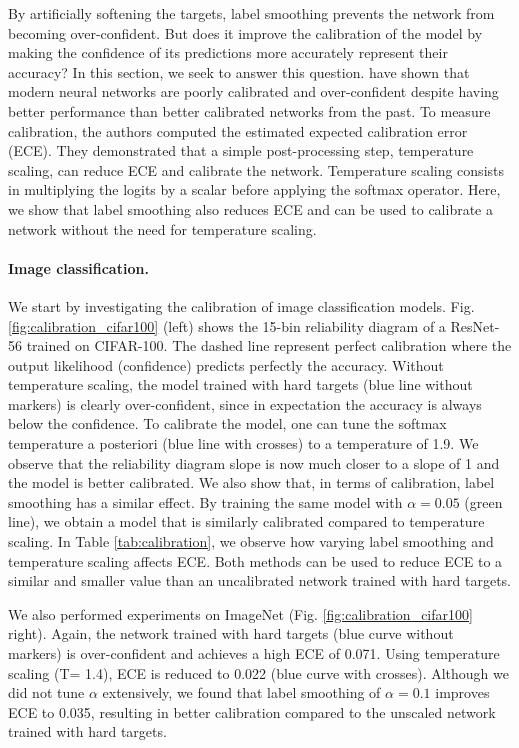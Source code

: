 \documentclass{article}
\begin{document}
By artificially softening the targets, label smoothing prevents the network from becoming over-confident. But does it improve the calibration of the model by making the confidence of its predictions more accurately represent their accuracy? In this section, we seek to answer this question. \citet{guo2017calibration} have shown that modern neural networks are poorly calibrated and over-confident despite having better performance than better calibrated networks from the past. To measure calibration, the authors computed the estimated expected calibration error (ECE). They demonstrated that a simple post-processing step, temperature scaling, can reduce ECE and calibrate the network. Temperature scaling consists in multiplying the logits by a scalar before applying the softmax operator. Here, we show that label smoothing also reduces ECE and can be used to calibrate a network without the need for temperature scaling. 

\paragraph{Image classification.} We start by investigating the calibration of image classification models. Fig. \ref{fig:calibration_cifar100} (left) shows the 15-bin reliability diagram of a ResNet-56 trained on CIFAR-100. The dashed line represent perfect calibration where the output likelihood (confidence) predicts perfectly the accuracy. Without temperature scaling, the model trained with hard targets (blue line without markers) is clearly over-confident, since in expectation the accuracy is always below the confidence. To calibrate the model, one can tune the softmax temperature a posteriori (blue line with crosses) to a temperature of 1.9. We observe that the reliability diagram slope is now much closer to a slope of 1 and the model is better calibrated. We also show that, in terms of calibration, label smoothing has a similar effect. By training the same model with $\alpha = 0.05$ (green line), we obtain a model that is similarly calibrated compared to temperature scaling. In Table \ref{tab:calibration}, we observe how varying label smoothing and temperature scaling affects ECE. Both methods can be used to reduce ECE to a similar and smaller value than an uncalibrated network trained with hard targets.

We also performed experiments on ImageNet (Fig. \ref{fig:calibration_cifar100} right). Again, the network trained with hard targets (blue curve without markers) is over-confident and achieves a high ECE of 0.071. Using temperature scaling (T= 1.4), ECE is reduced to 0.022 (blue curve with crosses). Although we did not tune $\alpha$ extensively, we found that label smoothing of $\alpha = 0.1$ improves ECE to 0.035, resulting in better calibration compared to the unscaled network trained with hard targets.
\end{document}
